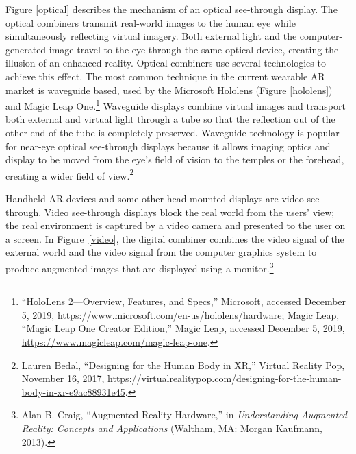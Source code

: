 \begin{enumerate}
Figure \ref{optical} describes the mechanism of an optical see-through display. The optical combiners transmit real-world images to the human eye while simultaneously reflecting virtual imagery. Both external light and the computer-generated image travel to the eye through the same optical device, creating the illusion of an enhanced reality. Optical combiners use several technologies to achieve this effect. The most common technique in the current wearable AR market is waveguide based, used by the Microsoft Hololens (Figure \ref{hololens}) and Magic Leap One.\footnote{“HoloLens 2—Overview, Features, and Specs,” Microsoft, accessed December 5, 2019, \url{https://www.microsoft.com/en-us/hololens/hardware}; Magic Leap, “Magic Leap One Creator Edition,” Magic Leap, accessed December 5, 2019, \url{https://www.magicleap.com/magic-leap-one}.} Waveguide displays combine virtual images and transport both external and virtual light through a tube so that the reflection out of the other end of the tube is completely preserved. Waveguide technology is popular for near-eye optical see-through displays because it allows imaging optics and display to be moved from the eye’s field of vision to the temples or the forehead, creating a wider field of view.\footnote{Lauren Bedal, “Designing for the Human Body in XR,” Virtual Reality Pop, November 16, 2017, \url{https://virtualrealitypop.com/designing-for-the-human-body-in-xr-e9ac88931e45}.}

\begin{figure}[!ht]
\vspace{-.1 in}
\end{figure}

Handheld AR devices and some other head-mounted displays are video see-through. Video see-through displays block the real world from the users’ view; the real environment is captured by a video camera and presented to the user on a screen. In Figure~\ref{video}, the digital combiner combines the video signal of the external world and the video signal from the computer graphics system to produce augmented images that are displayed using a monitor.\footnote{Alan B. Craig, “Augmented Reality Hardware,” in \textit{Understanding Augmented Reality: Concepts and Applications} (Waltham, MA: Morgan Kaufmann, 2013).}
	

\end{enumerate}
